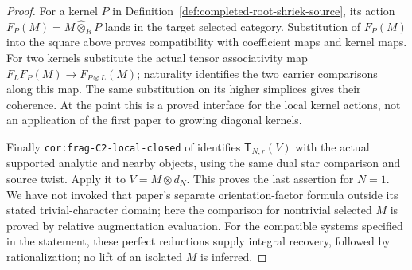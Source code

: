 \documentclass[11pt]{article}
\theoremstyle{definition}
\theoremstyle{remark}
\begin{document}
\begin{proof}
For a kernel $P$ in Definition~\ref{def:completed-root-shriek-source},
its action $F_P(M)=M\widehat\otimes_R P$
lands in the target selected category.  Substitution of $F_P(M)$
into the square above proves compatibility with coefficient maps
and kernel maps.  For two kernels substitute the actual tensor
associativity map $F_LF_P(M)\to F_{P\otimes L}(M)$; naturality
identifies the two carrier comparisons along this map.  The same
substitution on its higher simplices gives their coherence.  At
the point this is a proved interface for the local kernel actions,
not an application of the first paper to growing diagonal kernels.

Finally \texttt{cor:frag-C2-local-closed} of \cite{Local} identifies
$\mathsf T_{N,r}(V)$ with the actual supported analytic and nearby
objects, using the same dual star comparison and source twist.
Apply it to $V=M\otimes d_N$.  This proves the last assertion for
$N=1$.  We have not invoked that paper's separate orientation-factor
formula outside its stated trivial-character domain; here the
comparison for nontrivial selected $M$ is proved by relative
augmentation evaluation.  For the compatible systems specified in
the statement, these perfect reductions supply integral recovery,
followed by rationalization; no lift of an isolated $M$ is inferred.
\end{proof}
\end{document}
